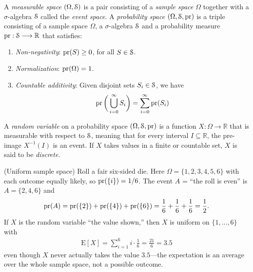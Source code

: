 \documentclass[a4paper, 12pt]{book} %
\begin{document}
A \emph{measurable space} $(\Omega, \EuScript{S})$ is a pair consisting of a \emph{sample space} $\Omega$ together with a $\sigma$-algebra $\EuScript{S}$ called the \emph{event space}. A \emph{probability space} $(\Omega, \EuScript{S}, \operatorname{pr})$ is a triple consisting of a sample space $\Omega$, a $\sigma$-algebra $\EuScript{S}$ and a probability measure $\operatorname{pr}: \EuScript{S} \longrightarrow \mathbb{R}$ that satisfies:
\begin{enumerate}
    \item \emph{Non-negativity}: $\operatorname{pr}(S) \geq 0$, for all $S \in \EuScript{S}$.
    \item \emph{Normalization}: $\operatorname{pr}(\Omega) = 1$.
    \item \emph{Countable additivity}: Given disjoint sets $S_i \in \EuScript{S}$, we have 
    \begin{align}
        \operatorname{pr}\bigg( \bigcup_{i=0}^\infty S_i \bigg) = \sum_{i=0}^\infty \operatorname{pr}(S_i)
    \end{align}
\end{enumerate}

\begin{definition}
    A \emph{random variable} on a probability space $(\Omega, \EuScript{S}, \operatorname{pr})$ is a function $X: \Omega \longrightarrow \mathbb{R}$ that is measurable with respect to $\EuScript{S}$, meaning that for every interval $I \subseteq \mathbb{R}$, the pre-image $X^{-1}(I)$ is an event. If $X$ takes values in a finite or countable set, $X$ is said to be \emph{discrete}.
\end{definition}

\begin{example}
    (Uniform sample space) Roll a fair six-sided die. Here $\Omega = \{1,2,3,4,5,6\}$ with each outcome equally likely, so $\operatorname{pr}(\{i\}) = 1/6$. The event $A$ = ``the roll is even'' is $A = \{2,4,6\}$ and
    \begin{align}
        \operatorname{pr}(A) = \operatorname{pr}(\{2\}) + \operatorname{pr}(\{4\}) + \operatorname{pr}(\{6\}) = \frac{1}{6}+\frac{1}{6}+\frac{1}{6} = \frac{1}{2}.
    \end{align}
    If $X$ is the random variable ``the value shown,'' then $X$ is uniform on $\{1,\ldots,6\}$ with
    \begin{align}
        \mathrm{E}[X] = \sum_{i=1}^{6} i \cdot \frac{1}{6} = \frac{21}{6} = 3.5
    \end{align}
    even though $X$ never actually takes the value $3.5$---the expectation is an average over the whole sample space, not a possible outcome.
\end{example}
\end{document}
